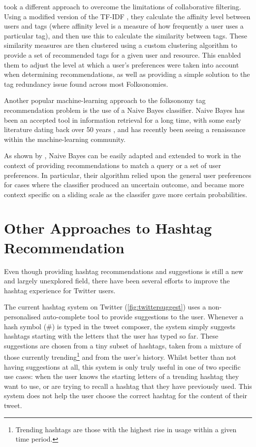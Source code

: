 \documentclass[11pt,a4paper]{report}
\begin{document}
\textcite{Niwa:2006} took a different approach to overcome the limitations of collaborative filtering. Using a modified version of the TF-IDF \parencite{Salton:1988}, they calculate the affinity level between users and tags (where affinity level is a measure of how frequently a user uses a particular tag), and then use this to calculate the similarity between tags. These similarity measures are then clustered using a custom clustering algorithm to provide a set of recommended tags for a given user and resource. This enabled them to adjust the level at which a user's preferences were taken into account when determining recommendations, as well as providing a simple solution to the tag redundancy issue found across most Folksonomies.

Another popular machine-learning approach to the folksonomy tag recommendation problem is the use of a Naive Bayes classifier. Naive Bayes has been an accepted tool in information retrieval for a long time, with some early literature dating back over 50 years \parencite{Maron:1960}, and has recently been seeing a renaissance within the machine-learning community.

As shown by \textcite{DePessemier:2010}, Naive Bayes can be easily adapted and extended to work in the context of providing recommendations to match a query or a set of user preferences. In particular, their algorithm relied upon the general user preferences for cases where the classifier produced an uncertain outcome, and became more context specific on a sliding scale as the classifer gave more certain probabilities.

\section{Other Approaches to Hashtag Recommendation}
Even though providing hashtag recommendations and suggestions is still a new and largely unexplored field, there have been several efforts to improve the hashtag experience for Twitter users.

The current hashtag system on Twitter (\autoref{fig:twittersuggest}) uses a non-personalised auto-complete tool to provide suggestions to the user. Whenever a hash symbol (\#) is typed in the tweet composer, the system simply suggests hashtags starting with the letters that the user has typed so far. These suggestions are chosen from a tiny subset of hashtags, taken from a mixture of those currently trending\footnote{Trending hashtags are those with the highest rise in usage within a given time period.} and from the user's history. Whilst better than not having suggestions at all, this system is only truly useful in one of two specific use cases: when the user knows the starting letters of a trending hashtag they want to use, or are trying to recall a hashtag that they have previously used. This system does not help the user choose the correct hashtag for the content of their tweet.
\end{document}

